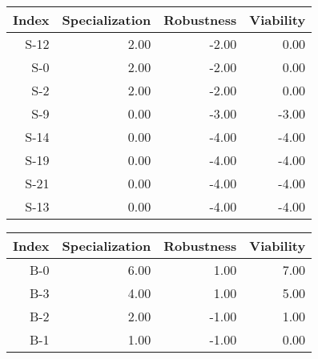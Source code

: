 


\begin{tabular}{ | r | r | r | r | }
    \hline
                 Index  &  Specialization  &      Robustness  &       Viability  \\
    \hline
    \hline
                  S-12  &            2.00  &           -2.00  &            0.00  \\
    \hline
                   S-0  &            2.00  &           -2.00  &            0.00  \\
    \hline
                   S-2  &            2.00  &           -2.00  &            0.00  \\
    \hline
                   S-9  &            0.00  &           -3.00  &           -3.00  \\
    \hline
                  S-14  &            0.00  &           -4.00  &           -4.00  \\
    \hline
                  S-19  &            0.00  &           -4.00  &           -4.00  \\
    \hline
                  S-21  &            0.00  &           -4.00  &           -4.00  \\
    \hline
                  S-13  &            0.00  &           -4.00  &           -4.00  \\
    \hline
\end{tabular}


\begin{tabular}{ | r | r | r | r | }
    \hline
                 Index  &  Specialization  &      Robustness  &       Viability  \\
    \hline
    \hline
                   B-0  &            6.00  &            1.00  &            7.00  \\
    \hline
                   B-3  &            4.00  &            1.00  &            5.00  \\
    \hline
                   B-2  &            2.00  &           -1.00  &            1.00  \\
    \hline
                   B-1  &            1.00  &           -1.00  &            0.00  \\
    \hline
\end{tabular}


